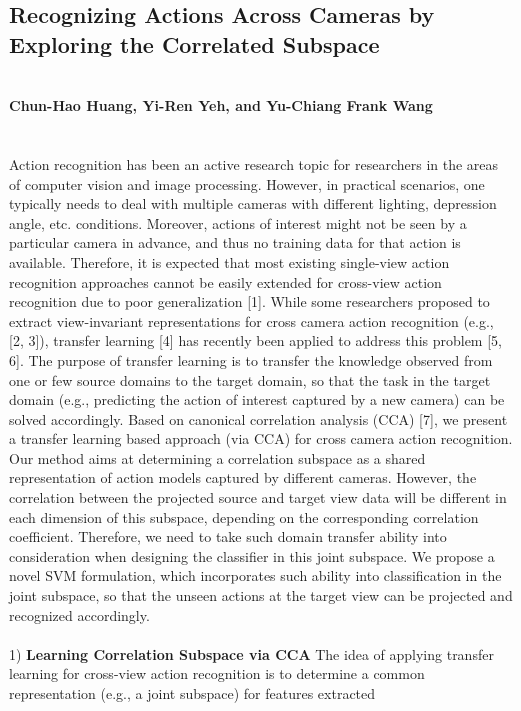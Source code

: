 \documentclass{article}
\begin{document}
\subsection{Recognizing Actions Across Cameras
by Exploring the Correlated Subspace}
\textbf{\small \\Chun-Hao Huang, Yi-Ren Yeh, and Yu-Chiang Frank Wang}
\\\\\\
Action recognition has been an active research topic for researchers in the areas
of computer vision and image processing. However, in practical scenarios, one
typically needs to deal with multiple cameras with different lighting, depression
angle, etc. conditions. Moreover, actions of interest might not be seen by a particular
camera in advance, and thus no training data for that action is available.
Therefore, it is expected that most existing single-view action recognition approaches
cannot be easily extended for cross-view action recognition due to poor
generalization [1].
While some researchers proposed to extract view-invariant representations
for cross camera action recognition (e.g., [2, 3]), transfer learning [4] has recently
been applied to address this problem [5, 6]. The purpose of transfer learning is
to transfer the knowledge observed from one or few source domains to the target
domain, so that the task in the target domain (e.g., predicting the action of
interest captured by a new camera) can be solved accordingly.
Based on canonical correlation analysis (CCA) [7], we present a transfer
learning based approach (via CCA) for cross camera action recognition. Our
method aims at determining a correlation subspace as a shared representation
of action models captured by different cameras. However, the correlation between
the projected source and target view data will be different in each dimension of
this subspace, depending on the corresponding correlation coefficient. Therefore,
we need to take such domain transfer ability into consideration when designing
the classifier in this joint subspace. We propose a novel SVM formulation, which
incorporates such ability into classification in the joint subspace, so that the
unseen actions at the target view can be projected and recognized accordingly.\\\\
1) \textbf{Learning Correlation Subspace via CCA}
The idea of applying transfer learning for cross-view action recognition is to
determine a common representation (e.g., a joint subspace) for features extracted
\end{document}
